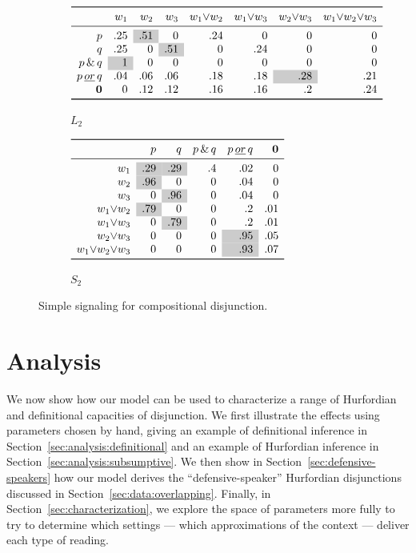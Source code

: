 \documentclass[12pt,twoside]{article}
\newcommand{\secref}[1]{Section~\ref{#1}}
\newcommand{\word}[1]{\emph{#1}}
\newcommand{\SpeakerK}[1][k]{S_{#1}}
\newcommand{\ListenerK}[1][k]{L_{#1}}
\newcommand{\nullmsg}{\mathbf{0}}
\newcommand{\graycell}[1]{{\cellcolor[gray]{.8}#1}}
\newcommand{\porq}{p\,\word{or}\,q}
\newcommand{\pandq}{p\,\&\,q}
\newcommand{\closurelex}[6][1]{
  \renewcommand{\arraystretch}{1}
  \begin{array}[c]{*{8}{r}}
    \toprule
    &w_{1}&w_{2}&w_{3}&w_{1}{\vee}w_{2}&w_{1}{\vee}w_{3}&w_{2}{\vee}w_{3}&w_{1}{\vee}w_{2}{\vee}w_{3}\\
    \midrule
    p      & #2 \\
    q      & #4 \\
    \pandq & #3 \\
    \porq  & #5 \\
    \nullmsg & #6 \\
    \bottomrule
  \end{array}}
\renewcommand{\_}{\textbf{\textunderscore\hspace{-4pt}\textunderscore\hspace{-3pt}\textunderscore\hspace{-4pt}\textunderscore}\hspace{0.5pt}}			%
\begin{document}
\begin{figure}[tp]
  \centering
  \begin{subfigure}{1\textwidth}
    \centering
    $\closurelex
    {.25 & \graycell{.51} & 0 & .24 & 0 & 0 & 0}
    {\graycell{1} & 0 & 0 & 0 & 0 & 0 & 0}
    {.25 & 0 & \graycell{.51} & 0 & .24 & 0 & 0}
    {.04 & .06 & .06 & .18 & .18 & \graycell{.28} & .21}
    {0 & .12 & .12 & .16 & .16 & .2 & .24}$
    \caption{$\ListenerK[2]$}
  \end{subfigure}

  \vspace{6pt}

  \begin{subfigure}{1\textwidth}
    \centering
    $\begin{array}[c]{ *{6}{r} }
       \toprule
       & p & q & \pandq & \porq & \nullmsg \\
       \midrule
       w_{1} & \graycell{.29} & \graycell{.29} & .4 & .02 & 0 \\
       w_{2} & \graycell{.96} & 0   & 0  & .04 & 0 \\
       w_{3} & 0   & \graycell{.96} & 0  & .04 & 0 \\
       w_{1}{\vee}w_{2} & \graycell{.79} & 0   & 0  & .2  & .01 \\
       w_{1}{\vee}w_{3} & 0   & \graycell{.79} & 0 & .2  & .01 \\
       w_{2}{\vee}w_{3} & 0   & 0   & 0 & \graycell{.95} & .05 \\
       w_{1}{\vee}w_{2}{\vee}w_{3} & 0   & 0   & 0 & \graycell{.93} & .07 \\
       \bottomrule
     \end{array}$
     \caption{$\SpeakerK[2]$}
   \end{subfigure}
   \vspace{-4pt}
   \caption{Simple signaling for compositional disjunction.}
  \label{fig:compdisj}
\end{figure}




\vspace{-8pt}

\section{Analysis}\label{sec:analysis}

We now show how our model can be used to characterize a range of
Hurfordian and definitional capacities of disjunction. We first
illustrate the effects using parameters chosen by hand, giving an
example of definitional inference in
\secref{sec:analysis:definitional} and an example of Hurfordian
inference in \secref{sec:analysis:subsumptive}.  We then show in
\secref{sec:defensive-speakers} how our model derives the
``defensive-speaker'' Hurfordian disjunctions discussed in
\secref{sec:data:overlapping}.  Finally, in
\secref{sec:characterization}, we explore the space of parameters more
fully to try to determine which settings --- which approximations of
the context --- deliver each type of reading.
\end{document}
